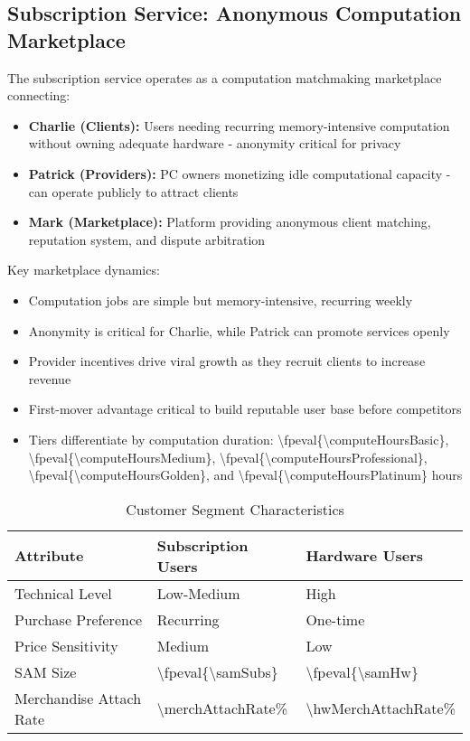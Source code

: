 \documentclass[11pt]{article}
\newcommand{\numint}[1]{\num[round-precision=0]{\fpeval{#1}}}
\begin{document}
\subsection{Subscription Service: Anonymous Computation Marketplace}
The subscription service operates as a computation matchmaking marketplace connecting:
\begin{itemize}
  \item \textbf{Charlie (Clients):} Users needing recurring memory-intensive computation without owning adequate hardware - anonymity critical for privacy
  \item \textbf{Patrick (Providers):} PC owners monetizing idle computational capacity - can operate publicly to attract clients
  \item \textbf{Mark (Marketplace):} Platform providing anonymous client matching, reputation system, and dispute arbitration
\end{itemize}

Key marketplace dynamics:
\begin{itemize}
  \item Computation jobs are simple but memory-intensive, recurring weekly
  \item Anonymity is critical for Charlie, while Patrick can promote services openly
  \item Provider incentives drive viral growth as they recruit clients to increase revenue\cite{parker2016}
  \item First-mover advantage critical to build reputable user base before competitors
  \item Tiers differentiate by computation duration: \numint{\computeHoursBasic}, \numint{\computeHoursMedium}, \numint{\computeHoursProfessional}, \numint{\computeHoursGolden}, and \numint{\computeHoursPlatinum} hours
\end{itemize}

\begin{table}[H]
\centering
\caption{Customer Segment Characteristics}
\begin{tabularx}{\linewidth}{l X X}
\toprule
Attribute & Subscription Users & Hardware Users \\\midrule
Technical Level & Low-Medium & High \\
Purchase Preference & Recurring & One-time \\
Price Sensitivity & Medium & Low \\
SAM Size & \numint{\samSubs}\cite{chainalysis2024,triple2023} & \numint{\samHw}\cite{chainalysis2024,triple2023} \\
Merchandise Attach Rate & \num{\merchAttachRate}\%\cite{shopify2024} & \num{\hwMerchAttachRate}\%\cite{shopify2024} \\
\bottomrule
\end{tabularx}
\end{table}
\end{document}
